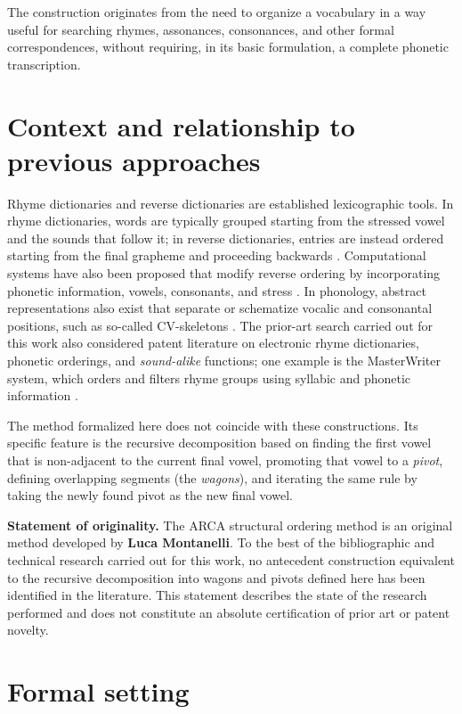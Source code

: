 \documentclass[11pt,a4paper]{article}
\theoremstyle{definition}
\theoremstyle{remark}
\begin{document}
The construction originates from the need to organize a vocabulary in a way useful for searching rhymes, assonances, consonances, and other formal correspondences, without requiring, in its basic formulation, a complete phonetic transcription.

\section{Context and relationship to previous approaches}

Rhyme dictionaries and reverse dictionaries are established lexicographic tools. In rhyme dictionaries, words are typically grouped starting from the stressed vowel and the sounds that follow it; in reverse dictionaries, entries are instead ordered starting from the final grapheme and proceeding backwards \cite{crifo2011}. Computational systems have also been proposed that modify reverse ordering by incorporating phonetic information, vowels, consonants, and stress \cite{byrdchodorow1985}. In phonology, abstract representations also exist that separate or schematize vocalic and consonantal positions, such as so-called CV-skeletons \cite{boudelaa2004}. The prior-art search carried out for this work also considered patent literature on electronic rhyme dictionaries, phonetic orderings, and \emph{sound-alike} functions; one example is the MasterWriter system, which orders and filters rhyme groups using syllabic and phonetic information \cite{masterwriter2005}.

The method formalized here does not coincide with these constructions. Its specific feature is the recursive decomposition based on finding the first vowel that is non-adjacent to the current final vowel, promoting that vowel to a \emph{pivot}, defining overlapping segments (the \emph{wagons}), and iterating the same rule by taking the newly found pivot as the new final vowel.

\medskip
\noindent\textbf{Statement of originality.} The ARCA structural ordering method is an original method developed by \textbf{Luca Montanelli}. To the best of the bibliographic and technical research carried out for this work, no antecedent construction equivalent to the recursive decomposition into wagons and pivots defined here has been identified in the literature. This statement describes the state of the research performed and does not constitute an absolute certification of prior art or patent novelty.

\section{Formal setting}
\end{document}
